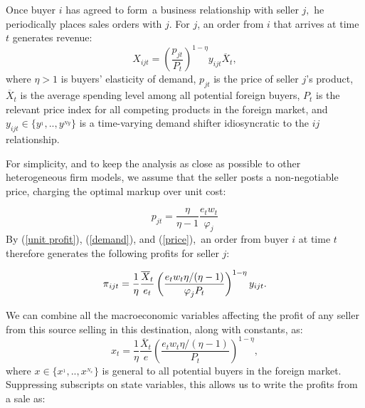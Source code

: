 \documentclass[12pt,titlepage]{article}
\begin{document}
Once buyer $i$ has agreed to form\ a business relationship with seller $j,$
he periodically places sales orders with $j$. For $j$, an order from $i$
that arrives at time $t$ generates revenue:%
\begin{equation}
X_{ijt}=\left( \frac{p_{jt}}{P_{t}}\right) ^{1-\eta }y_{ijt}\overline{X}_{t},
\label{demand}
\end{equation}%
where $\eta >1$ is buyers' elasticity of demand, $p_{jt}$ is the price of
seller $j$'s product, $\overline{X}_{t}$ is the average spending level among
all potential foreign buyers, $P_{t}$ is the relevant price index for all
competing products in the foreign market, and $y_{ijt}\in
\{y^{_{1}},..,y^{_{Ny}}\}$ is a time-varying demand shifter idiosyncratic to
the $ij$ relationship.\footnotemark{}

For simplicity, and to keep the analysis as close as possible to other
heterogeneous firm models, we assume that the seller posts a non-negotiable
price, charging the optimal markup over unit cost:\footnotemark{}

\begin{equation}
p_{jt}=\frac{\eta }{\eta -1}\frac{e_{t}w_{t}}{\varphi _{j}}  \label{price}
\end{equation}%
By (\ref{unit profit}), (\ref{demand}), and (\ref{price}),\ an order from
buyer $i$ at time $t$ therefore generates the following profits for seller $%
j $:

\begin{equation*}
\pi _{ijt}=\frac{1}{\eta }\frac{\overline{X}_{t}}{e_{t}}\left( \frac{%
e_{t}w_{t}\eta /(\eta -1)}{\varphi _{j}P_{t}}\right) ^{1-\eta }y_{ijt}.
\end{equation*}

We can combine all the macroeconomic variables affecting the profit of any
seller from this source selling in this destination, along with constants,
as:%
\begin{equation*}
x_{t}=\frac{1}{\eta }\frac{\overline{X}_{t}}{e}\left( \frac{e_{t}w_{t}\eta
/(\eta -1)}{P_{t}}\right) ^{1-\eta },
\end{equation*}%
where $x\in \{x^{_{1}},..,x^{_{N_{x}}}\}$ is general to all potential buyers
in the foreign market. Suppressing subscripts on state variables, this
allows us to write the profits from a sale as:
\end{document}

